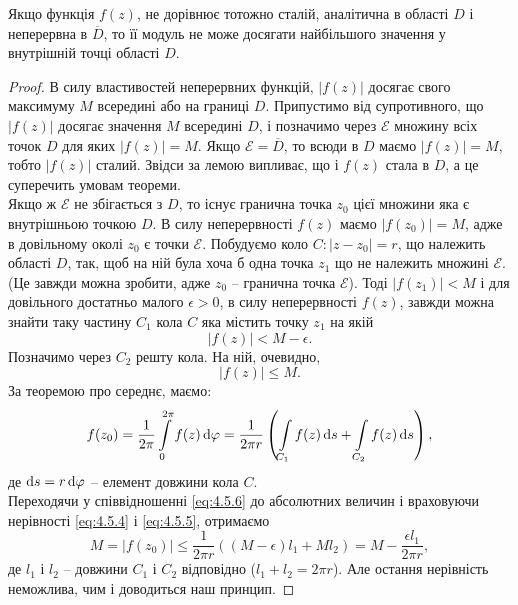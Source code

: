 \begin{theorem}
	Якщо функція $f(z)$, не дорівнює тотожно сталій, аналітична в області $D$ і неперервна в $\overline{D}$, то її модуль не може досягати найбільшого значення у внутрішній точці області $D$.
\end{theorem}

\begin{proof}
В силу властивостей неперервних функцій, $|f(z)|$ досягає свого максимуму $M$ всередині або на границі $D$. Припустимо від супротивного, що $|f(z)|$ досягає значення $M$ всередині $D$, і позначимо через $\mathcal{E}$ множину всіх точок $D$ для яких $|f(z)| = M$. Якщо $\mathcal{E} = \overline{D}$, то всюди в $D$ маємо $|f(z)| = M$, тобто $|f(z)|$ сталий. Звідси за лемою випливає, що і $f(z)$ стала в $D$, а це суперечить умовам теореми. \\

Якщо ж $\mathcal{E}$ не збігається з $D$, то існує гранична точка $z_0$ цієї множини яка є внутрішньою точкою $D$. В силу неперервності $f(z)$ маємо $|f(z_0)| = M$, адже в довільному околі $z_0$ є точки $\mathcal{E}$. Побудуємо коло $C: |z - z_0| = r$, що належить області $D$, так, щоб на ній була хоча б одна точка $z_1$ що не належить множині $\mathcal{E}$. (Це завжди можна зробити, адже $z_0$ -- гранична точка $\mathcal{E}$). Тоді $|f(z_1)| < M$ і для довільного достатньо малого $\epsilon > 0$, в силу неперервності $f(z)$, завжди можна знайти таку частину $C_1$ кола $C$ яка містить точку $z_1$ на якій
\begin{equation}
	\label{eq:4.5.4}
	|f(z)| < M - \epsilon.
\end{equation}
Позначимо через $C_2$ решту кола. На ній, очевидно,
\begin{equation}
	\label{eq:4.5.5}
	|f(z)| \le M.
\end{equation}
За теоремою про середнє, маємо:
\begin{equation}
\label{eq:4.5.6}
	f(z_0) = \dfrac{1}{2 \pi} \displaystyle\int\limits_0^{2 \pi} f(z) \mathop{}\!\mathrm{d} \varphi = \dfrac{1}{2 \pi r} \left(\displaystyle\int\limits_{C_1} f(z) \mathop{}\!\mathrm{d} s + \displaystyle\int\limits_{C_2} f(z) \mathop{}\!\mathrm{d} s \right),
\end{equation}
де $\mathop{}\!\mathrm{d} s = r \mathop{}\!\mathrm{d} \varphi$ -- елемент довжини кола $C$. \\

Переходячи у співвідношенні \eqref{eq:4.5.6} до абсолютних величин і враховуючи нерівності \eqref{eq:4.5.4} і \eqref{eq:4.5.5}, отримаємо
\begin{equation}
	\label{eq:4.5.7}
	M = |f(z_0)| \le \dfrac{1}{2 \pi r} ((M - \epsilon) l_1 + M l_2) = M - \dfrac{\epsilon l_1}{2 \pi r},
\end{equation}
де $l_1$ і $l_2$ -- довжини $C_1$ і $C_2$ відповідно ($l_1 + l_2 = 2 \pi r$). Але остання нерівність неможлива, чим і доводиться наш принцип.
\end{proof}

